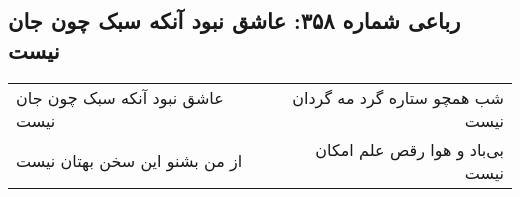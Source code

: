 \begin{center}
\section*{رباعی شماره ۳۵۸: عاشق نبود آنکه سبک چون جان نیست}
\label{sec:0358}
\begin{longtable}{l p{0.5cm} r}
عاشق نبود آنکه سبک چون جان نیست
&&
شب همچو ستاره گرد مه گردان نیست
\\
از من بشنو این سخن بهتان نیست
&&
بی‌باد و هوا رقص علم امکان نیست
\\
\end{longtable}
\end{center}
